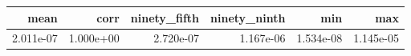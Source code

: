 \begin{tabular}{rrrrrr}
\toprule
mean & corr & ninety_fifth & ninety_ninth & min & max \\
\midrule
2.011e-07 & 1.000e+00 & 2.720e-07 & 1.167e-06 & 1.534e-08 & 1.145e-05 \\
\bottomrule
\end{tabular}
